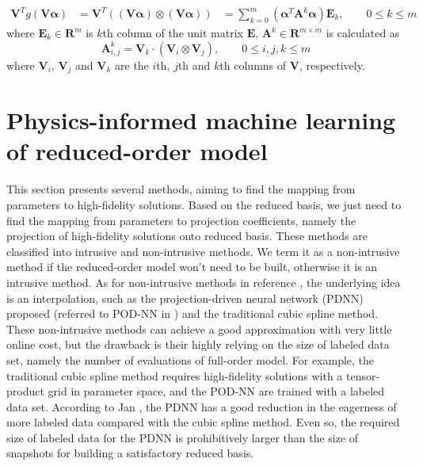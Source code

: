 \documentclass[preprint, 10pt]{elsarticle}
\begin{document}
\begin{equation}
\begin{aligned}
\mathbf{V}^T
g \left( \mathbf{V} \pmb{\alpha} \right)
&=
\mathbf{V}^T
\left(
\left( \mathbf{V} \pmb{\alpha} \right) \otimes \left( \mathbf{V} \pmb{\alpha} \right)
\right)
&= \sum_{k=0}^{m} { \left( \pmb{\alpha}^T \mathbf{A}^k \pmb{\alpha} \right) \mathbf{E}_k }, \qquad 0 \le k \le m
\end{aligned}
\label{eq_ReductionNonlinear}
\end{equation}
where $\mathbf{E}_k \in \mathbf{R}^{m}$ is $k$th column of the unit matrix $\mathbf{E}$, $\mathbf{A}^k \in \mathbf{R}^{m \times m}$ is calculated as
\begin{equation}
\mathbf{A}_{i,j}^k = \mathbf{V}_k \cdot \left( \mathbf{V}_i \otimes \mathbf{V}_j \right), \qquad 0 \le i,j,k \le m
\end{equation}
where $\mathbf{V}_i$, $\mathbf{V}_j$ and $\mathbf{V}_k$ are the $i$th, $j$th and $k$th columns of $\mathbf{V}$, respectively.

\section{Physics-informed machine learning of reduced-order model}
This section presents several methods, aiming to find the mapping from parameters to high-fidelity solutions. Based on the reduced basis, we just need to find the mapping from parameters to projection coefficients, namely the projection of high-fidelity solutions onto reduced basis.
These methods are classified into intrusive and non-intrusive methods. We term it as a non-intrusive method if the reduced-order model won't need to be built, otherwise it is an intrusive method.
As for non-intrusive methods in reference \cite{hesthaven2018non}, the underlying idea is an interpolation, such as the projection-driven neural network (PDNN) proposed (referred to POD-NN in \cite{hesthaven2018non}) and the traditional cubic spline method. These non-intrusive methods can achieve a good approximation with very little online cost, but the drawback is their highly relying on the size of labeled data set, namely the number of evaluations of full-order model.
For example, the traditional cubic spline method requires high-fidelity solutions with a tensor-product grid in parameter space, and the POD-NN are trained with a labeled data set.
According to Jan \cite{hesthaven2018non}, the PDNN has a good reduction in the eagerness of more labeled data compared with the cubic spline method.
Even so, the required size of labeled data for the PDNN is prohibitively larger than the size of snapshots for building a satisfactory reduced basis.
\end{document}
